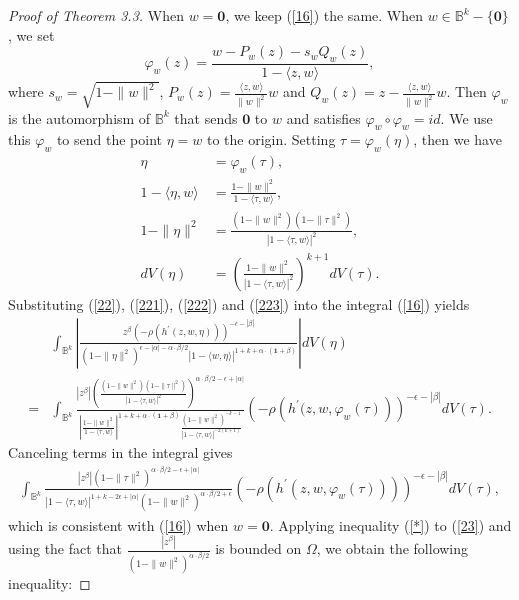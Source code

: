 \documentclass[reqno,12pt]{amsart}
\numberwithin{equation}{section}
\begin{document}
\begin{proof}[Proof of Theorem 3.3]
			When $w=\mathbf 0$, we keep (\ref{16}) the same. When $w\in \mathbb B^k-\{\mathbf 0\}$, we set $$\varphi_w(z)=\frac{w-P_w(z)-s_wQ_w(z)}{1-\langle z,w\rangle},$$
			where $s_w=\sqrt{1-\|w\|^2}$, $P_w(z)=\frac{\langle z,w\rangle}{\|w\|^2}w$ and $Q_w(z)=z-\frac{\langle z,w\rangle}{\|w\|^2}w$. {Then $\varphi_w$ is the automorphism of $\mathbb B^k$ that sends $\mathbf 0$ to $w$ and satisfies $\varphi_w\circ\varphi_w=id$. We use this $\varphi_w$ to send the point $\eta=w$ to the origin.}
			Setting ${\tau}=\varphi_w(\eta)$, then we have
			\begin{align}\label{22}
			\eta&=\varphi_w({\tau}),
			\\\label{221}1-\langle \eta,w \rangle&=\frac{1-\|w\|^2}{1-\langle {\tau},w\rangle},
			\\\label{222}1-\|\eta\|^2&=\frac{(1-\|w\|^2)(1-\|{\tau}\|^2)}{|1-\langle {\tau},w\rangle|^2},
			\\\label{223}dV(\eta)&=\left(\frac{1-\|w\|^2}{|1- \langle {\tau},w\rangle|^2}\right)^{k+1}dV({\tau}).
			\end{align}
			Substituting (\ref{22}), (\ref{221}), (\ref{222}) and (\ref{223}) into the integral (\ref{16}) yields
			\begin{align}
			&\int_{\mathbb B^k}\left|\frac{z^{\beta}\left(-\rho\left(h^{\prime}(z,w,\eta) \right)\right)^{-\epsilon-|\beta|}}{(1-\|\eta\|^2)^{\epsilon-|\alpha|-\alpha\cdot\beta/2}|1- \langle w,\eta\rangle |^{1+k+\alpha\cdot(\mathbf 1+\beta)}}\right|dV(\eta)\nonumber
			\\=&\int_{\mathbb B^k}\frac{|z^{\beta}|(\frac{(1-\|w\|^2)(1-\|{\tau}\|^2)}{|1-\langle {\tau},w\rangle|^2})^{\alpha\cdot\beta/2-\epsilon+|\alpha|}}{\left|\frac{1-\|w\|^2}{1- \langle {\tau},w\rangle}\right|^{1+k+\alpha\cdot(\mathbf 1+\beta)}\frac{(1-\|w\|^2)^{-k-1}}{|1-\langle {\tau},w \rangle|^{-2(k+1)}}}\left(-\rho\left(h^{\prime}(z,w,\varphi_w({\tau})\right)\right)^{-\epsilon-|\beta|}dV({\tau}).
			\end{align}
			Canceling terms in the integral gives
			\begin{align}\label{23}
			\int_{\mathbb B^k}\frac{|z^{\beta}|(1-\|{\tau}\|^2)^{\alpha\cdot\beta/2-\epsilon+|\alpha|}}{|1-\langle {\tau},w\rangle|^{1+k-2\epsilon+|\alpha|}(1-\|w\|^2)^{\alpha\cdot\beta/2+\epsilon}}\left(-\rho\left(h^{\prime}(z,w,\varphi_w({\tau})) \right)\right)^{-\epsilon-|\beta|}dV({\tau}),
			\end{align}
			which is consistent with (\ref{16}) when $w=\mathbf 0$.
			Applying inequality (\ref{*}) to (\ref{23}) and using the fact that $\frac{|z^{\beta}|}{(1-\|w\|^2)^{\alpha\cdot\beta/2}}$ is bounded on $\Omega$, we obtain the following inequality:

\end{proof}
\end{document}
